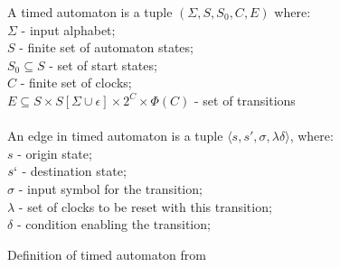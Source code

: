 \begin{figure}[H]
\caption{Definition of timed automaton from \cite{Automata_For_Modeling_Real-Time_Systems}}
A timed automaton is a tuple $(\Sigma, S, S_0, C, E)$ where:\\
$\Sigma$ - input alphabet;\\
$S$ - finite set of automaton states;\\
$S_0 \subseteq S$ - set of start states; \\
$C$ - finite set of clocks; \\
$E \subseteq S \times S [\Sigma \cup {\epsilon}] \times 2^C \times \Phi(C)$ - set of transitions\\\\
An edge in timed automaton is a tuple $\langle s, s', \sigma, \lambda \delta \rangle$, where:\\
$s$ - origin state;\\
$s`$ - destination state;\\
$\sigma$ - input symbol for the transition;\\
$\lambda$ - set of clocks to be reset with this transition;\\
$\delta$ - condition enabling the transition;\\
\label{fig:definition}
\end{figure}
